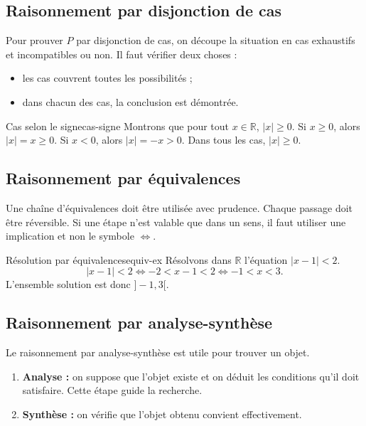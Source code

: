 \documentclass[11pt,a4paper]{article}
\newcommand{\R}{\mathbb{R}}
\begin{document}
\subsection{Raisonnement par disjonction de cas}

\begin{methodebox}
Pour prouver $P$ par disjonction de cas, on découpe la situation en cas exhaustifs et incompatibles ou non. Il faut vérifier deux choses :
\begin{itemize}
  \item les cas couvrent toutes les possibilités ;
  \item dans chacun des cas, la conclusion est démontrée.
\end{itemize}
\end{methodebox}

\begin{exemplebox}{Cas selon le signe}{cas-signe}
Montrons que pour tout $x\in\R$, $|x|\geq0$. Si $x\geq0$, alors $|x|=x\geq0$. Si $x<0$, alors $|x|=-x>0$. Dans tous les cas, $|x|\geq0$.
\end{exemplebox}

\subsection{Raisonnement par équivalences}

\begin{methodebox}
Une chaîne d'équivalences doit être utilisée avec prudence. Chaque passage doit être réversible. Si une étape n'est valable que dans un sens, il faut utiliser une implication et non le symbole $\Longleftrightarrow$.
\end{methodebox}

\begin{exemplebox}{Résolution par équivalences}{equiv-ex}
Résolvons dans $\R$ l'équation $|x-1|<2$.
\[
|x-1|<2 \Longleftrightarrow -2<x-1<2 \Longleftrightarrow -1<x<3.
\]
L'ensemble solution est donc $]-1,3[$.
\end{exemplebox}

\subsection{Raisonnement par analyse-synthèse}

\begin{methodebox}
Le raisonnement par analyse-synthèse est utile pour trouver un objet.
\begin{enumerate}
  \item \textbf{Analyse :} on suppose que l'objet existe et on déduit les conditions qu'il doit satisfaire. Cette étape guide la recherche.
  \item \textbf{Synthèse :} on vérifie que l'objet obtenu convient effectivement.
\end{enumerate}
\end{methodebox}
\end{document}
